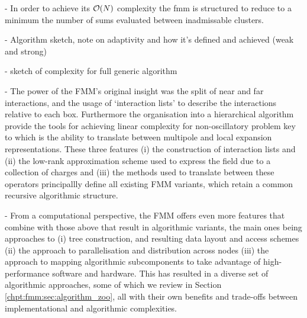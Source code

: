 - In order to achieve its $\mathcal{O}(N)$ complexity the \acrshort{fmm} is structured to reduce to a minimum the number of sums evaluated between inadmissable clusters.

- Algorithm sketch, note on adaptivity and how it's defined and achieved (weak and strong)

- sketch of complexity for full generic algorithm

- The power of the FMM's original insight was the split of near and far interactions, and the usage of `interaction lists' to describe the interactions relative to each box. Furthermore the organisation into a hierarchical algorithm provide the tools for achieving linear complexity for non-oscillatory problem key to which is the ability to translate between multipole and local expansion representations. These three features (i) the construction of interaction lists and (ii) the low-rank approximation scheme used to express the field due to a collection of charges and (iii) the methods used to translate between these operators principallly define all existing FMM variants, which retain a common recursive algorithmic structure.

- From a computational perspective, the FMM offers even more features that combine with those above that result in algorithmic variants, the main ones being approaches to (i) tree construction, and resulting data layout and access schemes (ii) the approach to parallelisation and distribution across nodes (iii) the approach to mapping algorithmic subcomponents to take advantage of high-performance software and hardware.  This has resulted in a diverse set of algorithmic approaches, some of which we review in Section \ref{chpt:fmm:sec:algorithm_zoo}, all with their own benefits and trade-offs between implementational and algorithmic complexities.







